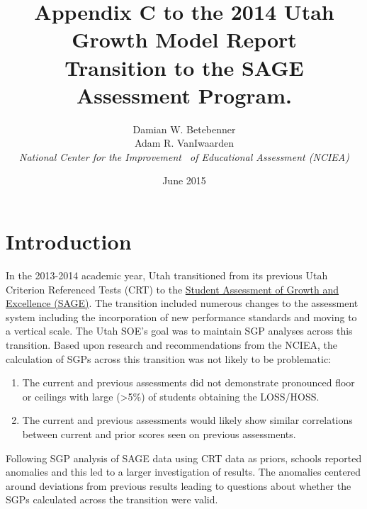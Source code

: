 \documentclass[12pt]{article}
\begin{document}
\newcommand{\pl}[1]{\textsf{PL#1}}
\newcommand{\Cov}{\ensuremath{\mbox{\textsf{Cov}}}}
\newcommand{\Diag}{\ensuremath{\mbox{\textsf{Diag}}}}
\newcommand{\Bias}{\ensuremath{\mbox{\textsf{Bias}}}}
\newcommand{\Astar}[1]{\ensuremath{#1^{^*}}}
\thispagestyle{plain}
\pagestyle{damian}

\title{\textsf{\LARGE Appendix C to the 2014 Utah Growth Model Report  \\\medskip Transition to the SAGE Assessment Program. }}
\author{  Damian W. Betebenner    \\   Adam R. VanIwaarden    \\   \emph{National Center for the Improvement \ of Educational Assessment (NCIEA)}   }

 \date{June 2015} 

\maketitle

\newpage


\section{Introduction}\label{introduction}

In the 2013-2014 academic year, Utah transitioned from its previous Utah
Criterion Referenced Tests (CRT) to the
\href{http://www.schools.utah.gov/assessment/SAGE.aspx}{Student
Assessment of Growth and Excellence (SAGE)}. The transition included
numerous changes to the assessment system including the incorporation of
new performance standards and moving to a vertical scale. The Utah SOE's
goal was to maintain SGP analyses across this transition. Based upon
research and recommendations from the NCIEA, the calculation of SGPs
across this transition was not likely to be problematic:

\begin{enumerate}
\def\labelenumi{\arabic{enumi}.}
\itemsep1pt\parskip0pt
\item
  The current and previous assessments did not demonstrate pronounced
  floor or ceilings with large (\textgreater{}5\%) of students obtaining
  the LOSS/HOSS.
\item
  The current and previous assessments would likely show similar
  correlations between current and prior scores seen on previous
  assessments.
\end{enumerate}

Following SGP analysis of SAGE data using CRT data as priors, schools
reported anomalies and this led to a larger investigation of results.
The anomalies centered around deviations from previous results leading
to questions about whether the SGPs calculated across the transition
were valid.
\end{document}
